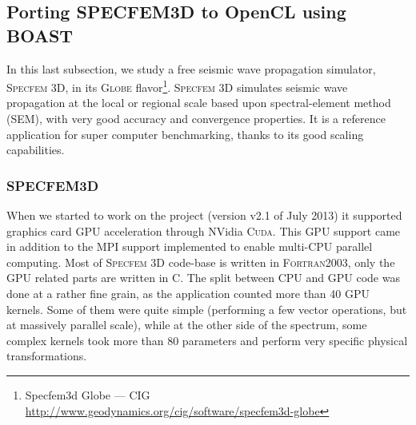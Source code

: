 \documentclass[11pt, a4paper, twoside]{montblanc}
\newcommand{\productname}[1]{\textsc{#1}}
\newcommand{\Specfem}{\productname{Specfem 3D}\xspace}
\newcommand{\Cuda}{\productname{Cuda}\xspace}
\begin{document}
% 
% 
% 
% 
 


  \subsection{Porting SPECFEM3D to OpenCL using BOAST}
  \label{subsec:specfem}

In this last subsection, we study a free seismic wave propagation
simulator, \Specfem, in its \productname{Globe}
flavor\footnote{Specfem3d Globe --- CIG
  \url{http://www.geodynamics.org/cig/software/specfem3d-globe}}. \Specfem
simulates seismic wave propagation at the local or regional scale
based upon spectral-element method (SEM), with very good accuracy and
convergence properties. It is a reference application for super
computer benchmarking, thanks to its good scaling capabilities.


    \subsubsection{SPECFEM3D}

When we started to work on the project (version v2.1 of July 2013) it
supported graphics card GPU acceleration through NVidia \Cuda. This
GPU support came in addition to the MPI support implemented to enable
multi-CPU parallel computing. Most of \Specfem code-base is written in
\productname{Fortran2003}, only the GPU related parts are written in
C.  The split between CPU and GPU code was done at a rather fine
grain, as the application counted more than 40 GPU kernels. Some of
them were quite simple (\eg performing a few vector operations, but at
massively parallel scale), while at the other side of the spectrum,
some complex kernels took more than 80 parameters and perform very
specific physical transformations.
\end{document}
